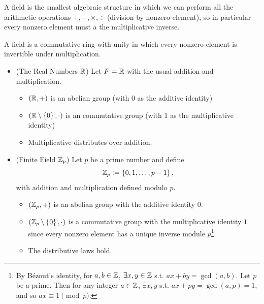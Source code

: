 \documentclass[11pt,openany]{article}
\begin{document}
\begin{remark}
 A field is the smallest algebraic structure in which we can perform all the arithmetic operations $+,-,\times,\div$ (division by nonzero element), so in particular every nonzero element must a the multiplicative inverse.
\end{remark}
\vspace{40pt}
\begin{example}
A field is a commutative ring with unity in which every nonzero element is invertible under multiplication. \begin{itemize}
	\item (The Real Numbers $\mathbb{R}$) Let $F=\mathbb{R}$ with the usual addition and multiplication. \begin{itemize}
		\item $(\mathbb{R},+)$ is an abelian group (with $0$ as the additive identity)
		\item $(\mathbb{R}\setminus\set{0},\cdot)$ is an commutative group (with $1$ as the multiplicative identity)
		\item Multiplicative distributes over addition.
	\end{itemize}
	\vspace{20pt}
	\item (Finite Field $\mathbb{Z}_p$) Let $p$ be a prime number and define \[
	\mathbb{Z}_p:=\set{0,1,\dots, p-1},
	\] with addition and multiplication defined modulo $p$. \begin{itemize}
		\item $(\mathbb{Z}_p,+)$ is an abelian group with the additive identity $0$.
		\item $(\mathbb{Z}_p\setminus\set{0},\cdot)$ is a commutative group with the multiplicative identity $1$ since every nonzero element has a unique inverse module $p$\footnote{By Bézout's identity, for $a,b\in\mathbb{Z}$, $\exists x,y\in\mathbb{Z}$ s.t. $ax+by=\gcd(a,b)$. Let $p$ be a prime. Then for any integer $a\in\mathbb{Z}$, $\exists x,y$ s.t. $ax+py=\gcd(a,p)=1$, and so $ax\equiv 1\pmod{p}$.}.
		\item The distributive laws hold.
	\end{itemize}
\end{itemize}
\end{example}
\end{document}
